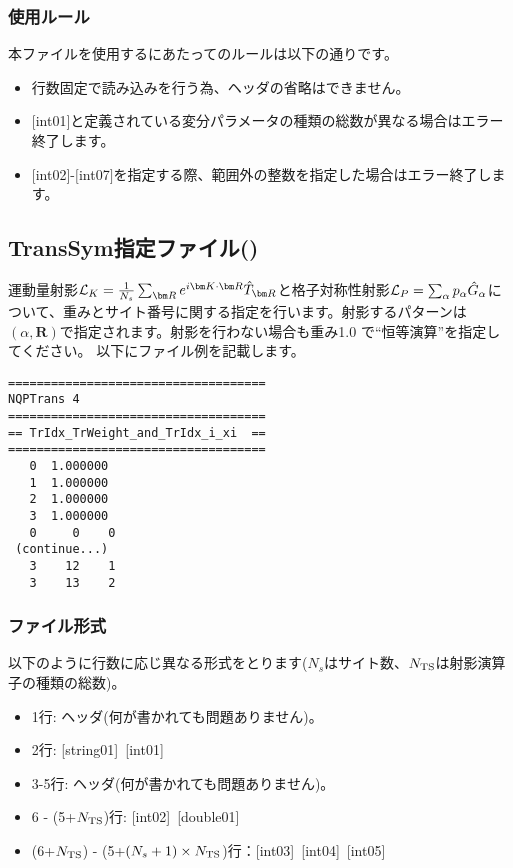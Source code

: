 \subsubsection{使用ルール}
本ファイルを使用するにあたってのルールは以下の通りです。
\begin{itemize}
\item 行数固定で読み込みを行う為、ヘッダの省略はできません。
\item $[$int01$]$と定義されている変分パラメータの種類の総数が異なる場合はエラー終了します。
\item $[$int02$]$-$[$int07$]$を指定する際、範囲外の整数を指定した場合はエラー終了します。
\end{itemize}



\newpage
\subsection{TransSym指定ファイル()}
\label{Subsec:TransSym}

運動量射影${\cal L}_K=\frac{1}{N_s}\sum_{{\bm R}}e^{i {\bm K} \cdot{\bm R} } \hat{T}_{\bm R}$と格子対称性射影${\cal L}_P=\sum_{\alpha}p_{\alpha} \hat{G}_{\alpha}$について、重みとサイト番号に関する指定を行います。射影するパターンは$(\alpha, {\bm R})$で指定されます。射影を行わない場合も重み1.0 で“恒等演算”を指定してください。
以下にファイル例を記載します。

\begin{minipage}{12.5cm}
\begin{screen}
\begin{verbatim}
====================================
NQPTrans 4  
====================================
== TrIdx_TrWeight_and_TrIdx_i_xi  ==
====================================
   0  1.000000
   1  1.000000
   2  1.000000
   3  1.000000
   0     0    0
 (continue...)
   3    12    1
   3    13    2 
\end{verbatim}
\end{screen}
\end{minipage}

\subsubsection{ファイル形式}
以下のように行数に応じ異なる形式をとります($N_s$はサイト数、$N_{\rm TS}$は射影演算子の種類の総数)。
 \begin{itemize}
   \item  1行:  ヘッダ(何が書かれても問題ありません)。
   \item  2行:   [string01]~[int01]
   \item  3-5行:  ヘッダ(何が書かれても問題ありません)。
   \item  6 - (5+$N_{\rm TS}$)行: [int02]~[double01]
   \item  (6+$N_{\rm TS}$) - (5+$(N_s+1) \times N_{\rm TS}$)行：[int03]~[int04]~[int05]
  \end{itemize}
